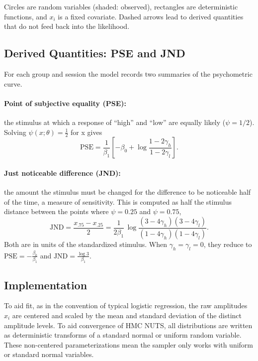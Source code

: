\documentclass[11pt]{article}
\begin{document}
\noindent
Circles are random variables (shaded: observed), rectangles are deterministic
functions, and $x_i$ is a fixed covariate. Dashed arrows lead to derived
quantities that do not feed back into the likelihood.


\subsection{Derived Quantities: PSE and JND}

For each group and session the model records two summaries of the psychometric
curve.

\paragraph{Point of subjective equality (PSE):} the stimulus at which a response of ``high'' and ``low'' are equally likely ($\psi = 1/2$). Solving
$\psi(x;\theta) = \tfrac12$ for x gives
\[
  \text{PSE} = \frac{1}{\beta_1}\left[-\beta_0 + \log\frac{1-2\gamma_h}{1-2\gamma_l}\right].
\]

\paragraph{Just noticeable difference (JND):} the amount the stimulus must be changed for the
difference to be noticeable half of the time, a measure of sensitivity. This is computed as half the stimulus distance between the points where $\psi = 0.25$ and $\psi = 0.75$,
\[
  \text{JND} = \frac{x_{.75} - x_{.25}}{2}
  = \frac{1}{2\beta_1}\,\log\frac{(3-4\gamma_h)(3-4\gamma_l)}{(1-4\gamma_h)(1-4\gamma_l)} .
\]
Both are in units of the standardized stimulus. When
$\gamma_h=\gamma_l=0$, they reduce to $\text{PSE} = - \frac{\beta_0}{\beta_1} $ and $\text{JND} =  \frac{\log 3}{\beta_1}$.

\subsection{Implementation}

To aid fit, as in the convention of typical logistic regression, the raw amplitudes $x_i$ are centered and scaled by the mean and standard deviation of the distinct amplitude levels. To aid convergence of HMC NUTS, all distributions are written as deterministic transforms of a standard normal or uniform random variable. These non-centered parameterizations mean the sampler only works with uniform or standard normal variables.
\end{document}
